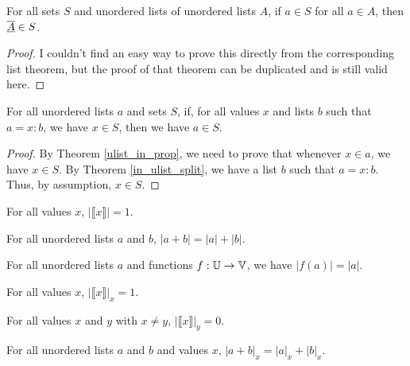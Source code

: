 \documentclass[../../math.tex]{subfiles}
\begin{document}
\begin{theorem} \label{ulist_prop_flatten}
    For all sets $S$ and unordered lists of unordered lists $A$, if $a \in S$
    for all $a \in A$, then $\underline{\overline{A}} \in S$.
\end{theorem}
\begin{proof}
    I couldn't find an easy way to prove this directly from the corresponding
    list theorem, but the proof of that theorem can be duplicated and is still
    valid here.
\end{proof}

\begin{theorem} \label{ulist_prop_split}
    For all unordered lists $a$ and sets $S$, if, for all values $x$ and lists
    $b$ such that $a = x : b$, we have $x \in S$, then we have $a \in S$.
\end{theorem}
\begin{proof}
    By Theorem \ref{ulist_in_prop}, we need to prove that whenever $x \in a$, we
    have $x \in S$.  By Theorem \ref{in_ulist_split}, we have a list $b$ such
    that $a = x : b$.  Thus, by assumption, $x \in S$.
\end{proof}

\begin{theorem}
    For all values $x$, $|\llbracket x\rrbracket| = 1$.
\end{theorem}

\begin{theorem} \label{ulist_size_conc}
    For all unordered lists $a$ and $b$, $|a + b| = |a| + |b|$.
\end{theorem}

\begin{theorem} \label{ulist_image_size}
    For all unordered lists $a$ and functions $f : \mathbb{U} \to \mathbb{V}$, we have $|f(a)| =
    |a|$.
\end{theorem}

\begin{theorem}
    For all values $x$, $|\llbracket x\rrbracket |_x = 1$.
\end{theorem}

\begin{theorem}
    For all values $x$ and $y$ with $x \neq y$, $|\llbracket x\rrbracket|_y =
    0$.
\end{theorem}

\begin{theorem} \label{ulist_count_conc}
    For all unordered lists $a$ and $b$ and values $x$, $|a + b|_x = |a|_x +
    |b|_x$.
\end{theorem}
\end{document}
